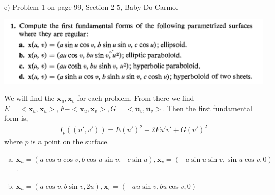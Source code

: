 \documentclass[10pt,letterpaper]{hmcpset}
\begin{document}
\newpage
\begin{problem}
e) Problem 1 on page 99, Section 2-5, Baby Do Carmo.

\includegraphics[scale=0.7]{Ce.png}
\end{problem}
\begin{solution}
We will find the $\textbf{x}_u, \textbf{x}_v$ for each problem. From there we
find $E=<\textbf{x}_u, \textbf{x}_u>, F - <\textbf{x}_u, \textbf{x}_v>,
G=<\textbf{u}_v, \textbf{u}_v>$. Then the first fundamental form is,
\begin{align*}
  I_p((u', v')) = E (u')^2 + 2Fu'v' + G(v')^2
\end{align*}
where $p$ is a point on the surface. \\
\begin{enumerate}[(a)]
\item $\textbf{x}_u = (a \cos u \cos v, b \cos u \sin v, -c \sin u),
  \textbf{x}_v = (-a \sin u \sin v, \sin u \cos v, 0)$.
\item $\textbf{x}_u = (a \cos v, b \sin v, 2u), \textbf{x}_v = (-au \sin v, bu
  \cos v, 0)$
\end{enumerate}
\end{solution}
\end{document}
